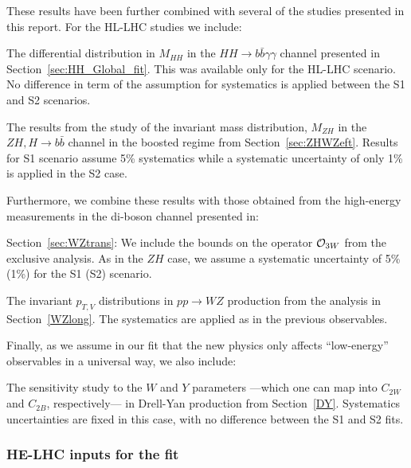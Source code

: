 These results have been further combined with several of the studies presented in this report. 
  For the HL-LHC studies we include:
  \begin{enumerate}
  {\item The differential distribution in $M_{HH}$ in the $HH\to b\bar{b}\gamma\gamma$ channel presented in Section~\ref{sec:HH_Global_fit}. This was available only for the HL-LHC scenario. No difference in term of the assumption for systematics is applied between the S1 and S2 scenarios.}
  {\item The results from the study of the invariant mass distribution, $M_{ZH}$ in the $ZH, H\to b\bar{b}$ channel in the boosted regime from Section~\ref{sec:ZHWZeft}. Results for S1 scenario assume 5\% systematics while a systematic uncertainty of only 1\% is applied in the S2 case. 
  }
  \end{enumerate}
 Furthermore, we combine these results with those obtained from the high-energy measurements in the di-boson channel presented in:
 \begin{enumerate}
 \setcounter{enumi}{2}
 {\item Section~\ref{sec:WZtrans}: We include the bounds on the operator ${\cal O}_{3W}$ from the exclusive analysis. As in the $ZH$ case, we assume a systematic uncertainty of 5\% (1\%) for the S1 (S2) scenario.}
 {\item The invariant $p_{T,V}$ distributions in $pp\to WZ$ production from the analysis in Section~\ref{WZlong}. The systematics are applied as in the previous observables.}  
 \end{enumerate}
%
Finally, as we assume in our fit that the new physics only affects ``low-energy'' observables in a universal way, we also include:
%
\begin{enumerate}
\setcounter{enumi}{4}
%
{\item The sensitivity study to the $W$ and $Y$ parameters ---which one can map into $C_{2W}$ and $C_{2B}$, respectively--- in Drell-Yan
production from Section~\ref{DY}. Systematics uncertainties are fixed in this case, with no difference between the S1 and S2 fits.}
%
\end{enumerate}
%


\subsubsection*{HE-LHC inputs for the fit}

